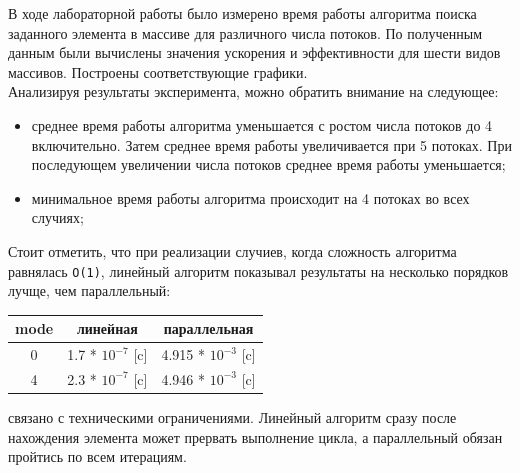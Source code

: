 \begin{adjustwidth}{-1cm}{}
\end{adjustwidth}


\newpage

\begin{adjustwidth}{-1cm}{}
\end{adjustwidth}




В ходе лабораторной работы было измерено время работы алгоритма поиска заданного элемента в массиве для различного числа потоков. По полученным данным были вычислены значения ускорения и эффективности для шести видов массивов. Построены соответствующие графики.\\
Анализируя результаты эксперимента, можно обратить внимание на следующее:

\vspace{3mm}
\begin{itemize}
\setlength{\itemsep}{10pt}
    \item среднее время работы алгоритма уменьшается с ростом числа потоков до 4 включительно. Затем среднее время работы увеличивается при 5 потоках. При последующем увеличении числа потоков среднее время работы уменьшается;
    \item минимальное время работы алгоритма происходит на 4 потоках во всех случиях;
\end{itemize}
\vspace{3mm}

Стоит отметить, что при реализации случиев, когда сложность алгоритма равнялась \verb|O(1)|, линейный алгоритм показывал результаты на несколько порядков лучще, чем параллельный:

\begin{center}
\renewcommand{\arraystretch}{1.4}
\begin{tabular}{|c|c|c|} 
    \hline
    mode & линейная & параллельная \\
    \hline
    0 & 1.7 * $10^{-7}$ [c] & 4.915 * $10^{-3}$ [c]\\
    \hline
    4 & 2.3 * $10^{-7}$ [c] & 4.946 * $10^{-3}$ [c]\\
    \hline
\end{tabular}
\end{center}

 связано с техническими ограничениями. Линейный алгоритм сразу после нахождения элемента может прервать выполнение цикла, а параллельный обязан пройтись по всем итерациям.\\

